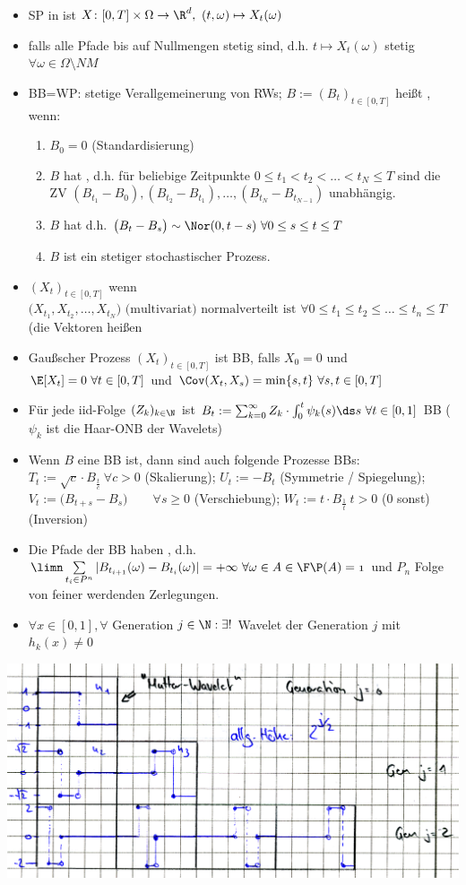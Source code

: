 	\begin{itemize}
		\item SP in  ist $X\colon[0,T]\times\Omega\to\R^d,~(t,\omega)\mapsto X_t(\omega)$
		\item {} falls alle Pfade bis auf Nullmengen stetig sind, d.h. $t\mapsto X_t(\omega)$ stetig $\forall\omega\in\Omega\setminus NM$
		\item BB=WP: stetige Verallgemeinerung von RWs; $B:=(B_t)_{t\in[0,T]}$ heißt , wenn:
		\begin{enumerate}
			\item $B_0=0$ (Standardisierung)
			\item $B$ hat , d.h. für beliebige Zeitpunkte $0\leq t_1<t_2<\ldots<t_N\leq T$ sind die ZV 
			$\left(B_{t_1}-B_0\right),\left(B_{t_2}-B_{t_1}\right),\ldots,\left(B_{t_N}-B_{t_{N-1}}\right)$ unabhängig.
			\item $B$ hat  d.h.
		 $\big(B_t-B_s\big)\sim\Nor(0,t-s)~\forall 0\leq s\leq t\leq T$
			\item $B$ ist ein stetiger stochastischer Prozess.
		\end{enumerate}
		\item $(X_t)_{t\in[0,T]}$  wenn $ \Big(X_{t_1},X_{t_2},\ldots,X_{t_N}\Big)\text{ (multivariat) normalverteilt ist }\forall0\leq t_1\leq t_2\leq\ldots\leq t_n\leq T $ (die Vektoren heißen  
		\item Gaußscher Prozess $(X_t)_{t\in[0,T]}$ ist BB, falls $X_0=0$ und $\E[X_t]=0~\forall t\in[0,T]$ und $\Cov(X_t,X_s)=\min\lbrace s,t\rbrace~\forall s,t\in[0,T]$
		\item Für jede iid-Folge $(Z_k)_{k\in\N}$ ist $B_t:=\sum_{k=0}^\infty Z_k\cdot\int_0^t\psi_k(s)\ds s~\forall t\in[0,1]$ BB ($\psi_k$ ist die Haar-ONB der Wavelets)
		\item Wenn $B$ eine BB ist, dann sind auch folgende Prozesse BBs:
		$T_t:=\sqrt{c}\cdot B_{\frac{t}{c}}~\forall c>0$ (Skalierung); 
		$U_t:=-B_t$ (Symmetrie / Spiegelung);
		$V_t:=\big(B_{t+s}-B_s\big)\qquad\forall s\geq0$ (Verschiebung);
		$W_t:=t\cdot B_{\frac{1}{t}}~t>0$ (0 sonst) (Inversion)
		\item Die Pfade der BB haben , d.h.
		$\limn\sum\limits_{t_i\in P^n}|B_{t_{i+1}}(\omega)-B_{t_i}(\omega)|=+\infty~\forall\omega\in A\in\F\mit\P(A)=1$ und $P_n$ Folge von feiner werdenden Zerlegungen.
		\item {} $\forall x\in[0,1],\forall$ Generation $j\in\N:\exists!$ Wavelet der Generation $j$ mit $h_k(x)\neq0$
	\end{itemize}
	\includegraphics[width=1\textwidth]{./pics/WTHMscan001.png}

